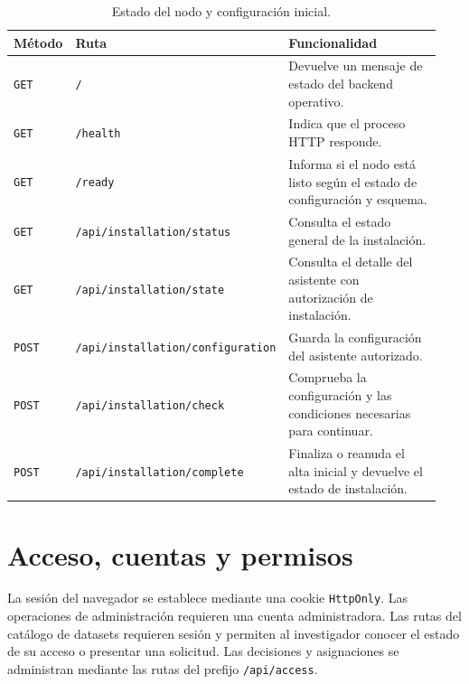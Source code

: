 \begin{table}[!htbp]
    \centering
    \caption{Estado del nodo y configuración inicial.}
    \small
    \setlength{\tabcolsep}{4pt}
    \renewcommand{\arraystretch}{1.13}
    \begin{tabular}{@{}p{0.13\linewidth}p{0.36\linewidth}p{0.45\linewidth}@{}}
        \hline
        \textbf{Método} & \textbf{Ruta} & \textbf{Funcionalidad} \\
        \hline
        \texttt{GET} & \texttt{/\allowbreak{}} & Devuelve un mensaje de estado del backend operativo. \\
        \texttt{GET} & \texttt{/\allowbreak{}health} & Indica que el proceso HTTP responde. \\
        \texttt{GET} & \texttt{/\allowbreak{}ready} & Informa si el nodo está listo según el estado de configuración y esquema. \\
        \texttt{GET} & \texttt{/\allowbreak{}api/\allowbreak{}installation/\allowbreak{}status} & Consulta el estado general de la instalación. \\
        \texttt{GET} & \texttt{/\allowbreak{}api/\allowbreak{}installation/\allowbreak{}state} & Consulta el detalle del asistente con autorización de instalación. \\
        \texttt{POST} & \texttt{/\allowbreak{}api/\allowbreak{}installation/\allowbreak{}configuration} & Guarda la configuración del asistente autorizado. \\
        \texttt{POST} & \texttt{/\allowbreak{}api/\allowbreak{}installation/\allowbreak{}check} & Comprueba la configuración y las condiciones necesarias para continuar. \\
        \texttt{POST} & \texttt{/\allowbreak{}api/\allowbreak{}installation/\allowbreak{}complete} & Finaliza o reanuda el alta inicial y devuelve el estado de instalación. \\
        \hline
    \end{tabular}
\end{table}

\section{Acceso, cuentas y permisos}

La sesión del navegador se establece mediante una cookie \texttt{HttpOnly}.
Las operaciones de administración requieren una cuenta administradora.
Las rutas del catálogo de datasets requieren sesión y permiten al
investigador conocer el estado de su acceso o presentar una solicitud.
Las decisiones y asignaciones se administran mediante las rutas del
prefijo \texttt{/api/access}.

